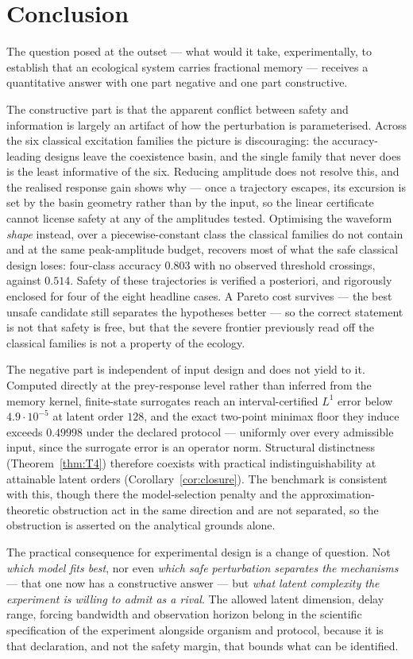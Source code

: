 \section{Conclusion}
\label{sec:conclusion}

The question posed at the outset --- what would it take, experimentally, to establish that an ecological system carries fractional memory --- receives a quantitative answer with one part negative and one part constructive.

The constructive part is that the apparent conflict between safety and information is largely an artifact of how the perturbation is parameterised. Across the six classical excitation families the picture is discouraging: the accuracy-leading designs leave the coexistence basin, and the single family that never does is the least informative of the six. Reducing amplitude does not resolve this, and the realised response gain shows why --- once a trajectory escapes, its excursion is set by the basin geometry rather than by the input, so the linear certificate cannot license safety at any of the amplitudes tested. Optimising the waveform \emph{shape} instead, over a piecewise-constant class the classical families do not contain and at the same peak-amplitude budget, recovers most of what the safe classical design loses: four-class accuracy $0.803$ with no observed threshold crossings, against $0.514$. Safety of these trajectories is verified a posteriori, and rigorously enclosed for four of the eight headline cases. A Pareto cost survives --- the best unsafe candidate still separates the hypotheses better --- so the correct statement is not that safety is free, but that the severe frontier previously read off the classical families is not a property of the ecology.

The negative part is independent of input design and does not yield to it. Computed directly at the prey-response level rather than inferred from the memory kernel, finite-state surrogates reach an interval-certified $L^1$ error below $4.9\cdot10^{-5}$ at latent order $128$, and the exact two-point minimax floor they induce exceeds $0.49998$ under the declared protocol --- uniformly over every admissible input, since the surrogate error is an operator norm. Structural distinctness (Theorem~\ref{thm:T4}) therefore coexists with practical indistinguishability at attainable latent orders (Corollary~\ref{cor:closure}). The benchmark is consistent with this, though there the model-selection penalty and the approximation-theoretic obstruction act in the same direction and are not separated, so the obstruction is asserted on the analytical grounds alone.

The practical consequence for experimental design is a change of question. Not \emph{which model fits best}, nor even \emph{which safe perturbation separates the mechanisms} --- that one now has a constructive answer --- but \emph{what latent complexity the experiment is willing to admit as a rival}. The allowed latent dimension, delay range, forcing bandwidth and observation horizon belong in the scientific specification of the experiment alongside organism and protocol, because it is that declaration, and not the safety margin, that bounds what can be identified.
